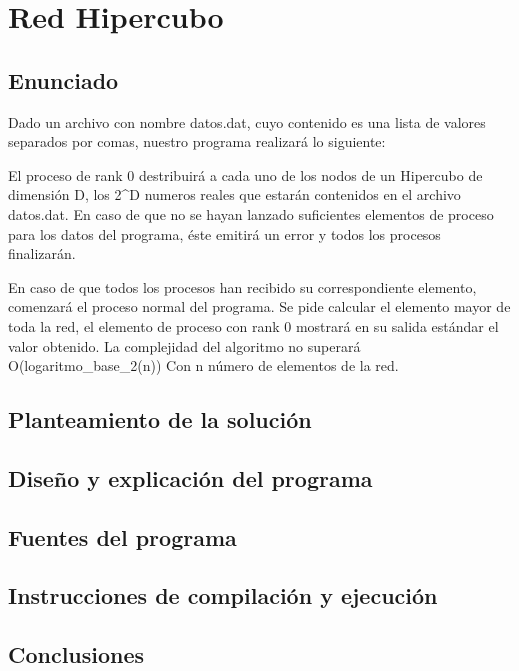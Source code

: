 \documentclass[11pt]{article}
\begin{document}
\section{Red Hipercubo}
\subsection{Enunciado}
Dado un archivo con nombre datos.dat, cuyo contenido es una lista de valores separados por comas, nuestro programa realizará lo siguiente:

El proceso de rank 0 destribuirá a cada uno de los nodos de un Hipercubo de dimensión D, los 2\^{}D numeros reales que estarán contenidos en el archivo datos.dat. En caso de que no se hayan lanzado suficientes elementos de proceso para los datos del programa, éste emitirá un error y todos los procesos finalizarán.

En caso de que todos los procesos han recibido su correspondiente elemento, comenzará el proceso normal del programa. Se pide calcular el elemento mayor de toda la red, el elemento de proceso con rank 0 mostrará en su salida estándar el valor obtenido. La complejidad del algoritmo no superará O(logaritmo\_base\_2(n)) Con n número de elementos de la red.


\subsection{Planteamiento de la solución}

\subsection{Diseño y explicación del programa}

\subsection{Fuentes del programa}


\subsection{Instrucciones de compilación y ejecución}

\subsection{Conclusiones}


\newpage
\nocite{*}  %


\end{document}
